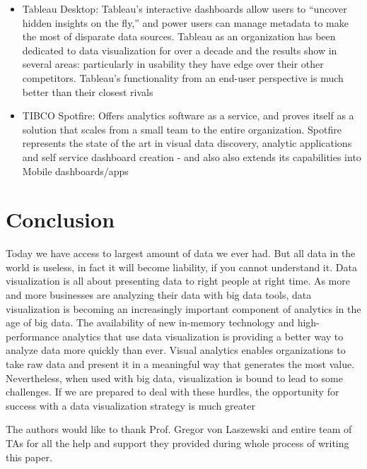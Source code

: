 \documentclass[sigconf]{acmart}
\begin{document}
\begin{itemize}
\item Tableau Desktop: Tableau’s interactive dashboards allow users to ``uncover hidden insights on the fly,'' and power users can manage metadata to make the most of disparate data sources.  Tableau as an organization has been dedicated to data visualization for over a decade and the results show in several areas: particularly in usability they have edge over their other competitors. Tableau’s functionality from an end-user perspective is much better than their closest rivals

\item TIBCO Spotfire: Offers analytics software as a service, and proves itself as a solution that scales from a small team to the entire organization. Spotfire represents the state of the art in visual data discovery, analytic applications and self service dashboard creation - and also also extends its capabilities into Mobile dashboards/apps
\end{itemize}\cite{sept1006}

\section{Conclusion}

 Today we have access to largest amount of data we ever had. But all data in the world is useless, in fact it will become liability, if you cannot understand it. Data visualization is all about presenting data to right people at right time.  As more and more businesses are analyzing their data with big data tools, data visualization is becoming an increasingly important component of analytics in the age of big data. The availability of new in-memory technology and high-performance analytics that use data visualization is providing a better way to analyze data more quickly than ever. Visual analytics enables organizations to take raw data and present it in a meaningful way that generates the most value. Nevertheless, when used with big data, visualization is bound to lead to some challenges. If we are prepared to deal with these hurdles, the opportunity for success with a data visualization strategy is much greater\cite{sept1005} 

\begin{acks}

  The authors would like to thank Prof. Gregor von Laszewski and entire team of TAs for all the help and support they provided during whole process of writing this paper.

\end{acks}




 
\end{document}
